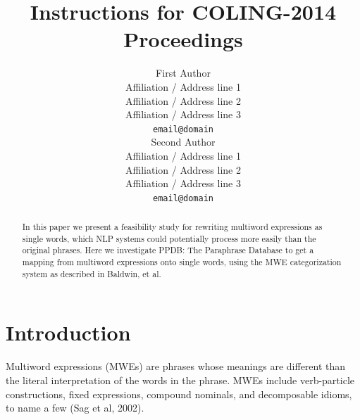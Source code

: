 \documentclass[11pt]{article}
\title{Instructions for COLING-2014 Proceedings}
\author{First Author \\
  Affiliation / Address line 1 \\
  Affiliation / Address line 2 \\
  Affiliation / Address line 3 \\
  {\tt email@domain} \\\And
  Second Author \\
  Affiliation / Address line 1 \\
  Affiliation / Address line 2 \\
  Affiliation / Address line 3 \\
  {\tt email@domain} \\}
\date{}
\begin{document}
\maketitle
\begin{abstract}
In this paper we present a feasibility study for rewriting multiword expressions as single words, which NLP systems could potentially process more easily than the original phrases. Here we investigate PPDB: The Paraphrase Database to get a mapping from multiword expressions onto single words, using the MWE categorization system as described in Baldwin, et al. 
\end{abstract}

\section{Introduction}
\label{intro}

%
% 

Multiword expressions (MWEs) are phrases whose meanings are different than the literal interpretation of the words in the phrase. MWEs include verb-particle constructions, fixed expressions, compound nominals, and decomposable idioms, to name a few (Sag et al, 2002). 
\end{document}
